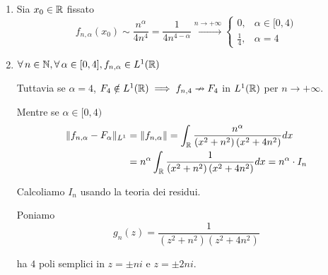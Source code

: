 \Soluzione
\begin{enumerate}
\item Sia $x_{0} \in \RR $ fissato
\begin{equation*}
f_{n,\alpha }(x_{0}) \sim \frac{n^{\alpha }}{4n^{4}} = \frac{1}{4n^{4 - \alpha }}\xrightarrow{n\rightarrow + \infty }
\begin{cases}
0, & \alpha \in [ 0,4)\\
\frac{1}{4} , & \alpha = 4
\end{cases}
\end{equation*}
\item $\forall n\in \NN  ,\forall \alpha \in [ 0,4] ,f_{n,\alpha } \in L^{1}(\RR)$

Tuttavia se $\alpha = 4$, $F_{4} \notin L^{1}(\RR) \implies f_{n,4} \nrightarrow F_{4}$ in $L^{1}(\RR)$ per $n\rightarrow + \infty $.

Mentre se $\alpha \in [ 0,4)$
\begin{equation*}
\begin{aligned}
\Vert f_{n,\alpha } - F_{\alpha }\Vert _{L^{1}} & = \Vert f_{n,\alpha }\Vert = \int _{\RR }\frac{n^{\alpha }}{\left(x^{2} + n^{2}\right)\left(x^{2} + 4n^{2}\right)} dx\\
 & = n^{\alpha }\int _{\RR }\frac{1}{\left(x^{2} + n^{2}\right)\left(x^{2} + 4n^{2}\right)} dx = n^{\alpha } \cdot I_{n}
\end{aligned}
\end{equation*}

Calcoliamo $I_{n}$ usando la teoria dei residui.

Poniamo
\begin{equation*}
g_{n}(z) = \frac{1}{\left(z^{2} + n^{2}\right)\left(z^{2} + 4n^{2}\right)}
\end{equation*}

ha $4$ poli semplici in $z = \pm ni$ e $z = \pm 2ni$.

\begin{figure}[htpb]
	\centering
{} %

\begin{tikzpicture}[x = 0.75pt,y = 0.75pt,yscale = -1,xscale = 1]


\end{tikzpicture}
\end{figure}
\end{enumerate}

